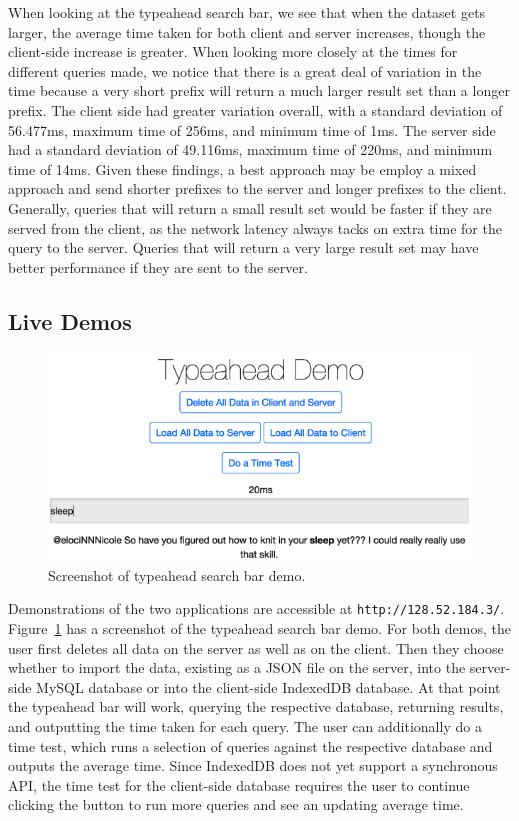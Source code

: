 \documentclass{vldb}
\begin{document}
When looking at the typeahead search bar, we see that when the dataset gets larger, the average time taken for both client and server increases, though the client-side increase is greater. When looking more closely at the times for different queries made, we notice that there is a great deal of variation in the time because a very short prefix will return a much larger result set than a longer prefix. The client side had greater variation overall, with a standard deviation of 56.477ms, maximum time of 256ms, and minimum time of 1ms. The server side had a standard deviation of 49.116ms, maximum time of 220ms, and minimum time of 14ms. Given these findings, a best approach may be employ a mixed approach and send shorter prefixes to the server and longer prefixes to the client. Generally, queries that will return a small result set would be faster if they are served from the client, as the network latency always tacks on extra time for the query to the server. Queries that will return a very large result set may have better performance if they are sent to the server.



\subsection{Live Demos}

\begin{figure}[h!]
\centering
   \includegraphics[scale=.34]{typeahead}
  \caption{Screenshot of typeahead search bar demo.}
\label{demo}
\end{figure}
Demonstrations of the two applications are accessible at \texttt{http://128.52.184.3/}. Figure~\ref{demo} has a screenshot of the typeahead search bar demo. For both demos, the user first deletes all data on the server as well as on the client. Then they choose whether to import the data, existing as a JSON file on the server, into the server-side MySQL database or into the client-side IndexedDB database. At that point the typeahead bar will work, querying the respective database, returning results, and outputting the time taken for each query. The user can additionally do a time test, which runs a selection of queries against the respective database and outputs the average time. Since IndexedDB does not yet support a synchronous API, the time test for the client-side database requires the user to continue clicking the button to run more queries and see an updating average time.
\end{document}
